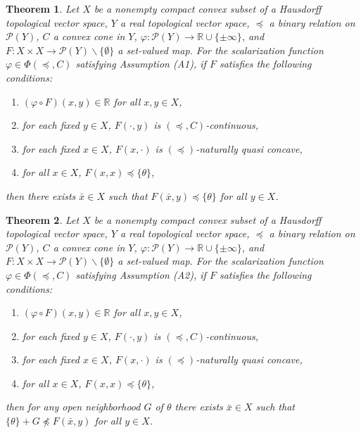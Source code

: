 \documentclass[a4paper,11pt]{jsarticle}
\newtheorem{thm}{Theorem}[section]
\theoremstyle{definition}
\newcommand{\RealNumberSet}{\mathbb{R}}
\begin{document}
\begin{thm}
  Let $X$ be a nonempty compact convex subset of a Hausdorff topological vector space,
  $Y$ a real topological vector space, $\preccurlyeq$ a binary relation on $\mathcal{P}(Y)$,
  $C$ a convex cone in $Y$, $\varphi\colon \mathcal{P}(Y) \to \RealNumberSet \cup \{\pm \infty\}$,
  and $F\colon X \times X \to \mathcal{P}(Y) \backslash \{\emptyset\}$ a set-valued map.
  For the scalarization function $\varphi \in \Phi(\preccurlyeq, C)$ satisfying Assumption (A1),
  if $F$ satisfies the following conditions:
  \begin{enumerate}
    \item $(\varphi \circ F)(x,y) \in \RealNumberSet$ for all $x,y \in X$,
    \item for each fixed $y \in X$, $F(\cdot,y)$ is $(\preccurlyeq, C)$-continuous,
    \item for each fixed $x \in X$, $F(x,\cdot)$ is $(\preccurlyeq)$-naturally quasi concave,
    \item for all $x \in X$, $F(x,x) \preccurlyeq \{\theta\}$,
  \end{enumerate}
  then there exists $\bar{x} \in X$ such that $ F(\bar{x},y) \preccurlyeq \{\theta\} $ for all $y \in X$.
\end{thm}

\begin{thm}
  Let $X$ be a nonempty compact convex subset of a Hausdorff topological vector space,
  $Y$ a real topological vector space, $\preccurlyeq$ a binary relation on $\mathcal{P}(Y)$,
  $C$ a convex cone in $Y$, $\varphi\colon \mathcal{P}(Y) \to \RealNumberSet \cup \{\pm \infty\}$,
  and $F\colon X \times X \to \mathcal{P}(Y) \backslash \{\emptyset\}$ a set-valued map.
  For the scalarization function $\varphi \in \Phi(\preccurlyeq, C)$ satisfying Assumption (A2),
  if $F$ satisfies the following conditions:
  \begin{enumerate}
    \item $(\varphi \circ F)(x,y) \in \RealNumberSet$ for all $x,y \in X$,
    \item for each fixed $y \in X$, $F(\cdot,y)$ is $(\preccurlyeq, C)$-continuous,
    \item for each fixed $x \in X$, $F(x,\cdot)$ is $(\preccurlyeq)$-naturally quasi concave,
    \item for all $x \in X$, $F(x,x) \preccurlyeq \{\theta\}$,
  \end{enumerate}
  then for any open neighborhood $G$ of $\theta$ there exists $\bar{x} \in X$ such that $\{\theta\} + G \npreccurlyeq F(\bar{x},y)$
  for all $y \in X$.
\end{thm}
\end{document}
